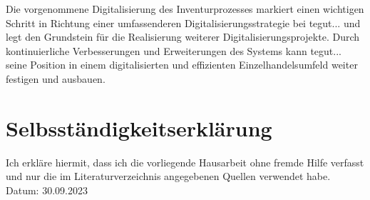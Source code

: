 \documentclass[12pt, a4paper]{article}
\begin{document}
Die vorgenommene Digitalisierung des Inventurprozesses markiert einen wichtigen Schritt in Richtung einer umfassenderen Digitalisierungsstrategie bei tegut... und legt den 
Grundstein für die Realisierung weiterer Digitalisierungsprojekte. Durch kontinuierliche Verbesserungen und Erweiterungen des Systems kann tegut... seine Position in einem 
digitalisierten und effizienten Einzelhandelsumfeld weiter festigen und ausbauen.

\section*{Selbsständigkeitserklärung}
Ich erkläre hiermit, dass ich die vorliegende Hausarbeit ohne fremde Hilfe verfasst und nur die im Literaturverzeichnis angegebenen Quellen verwendet habe.\\

Datum: 30.09.2023

\newpage


\end{document}
